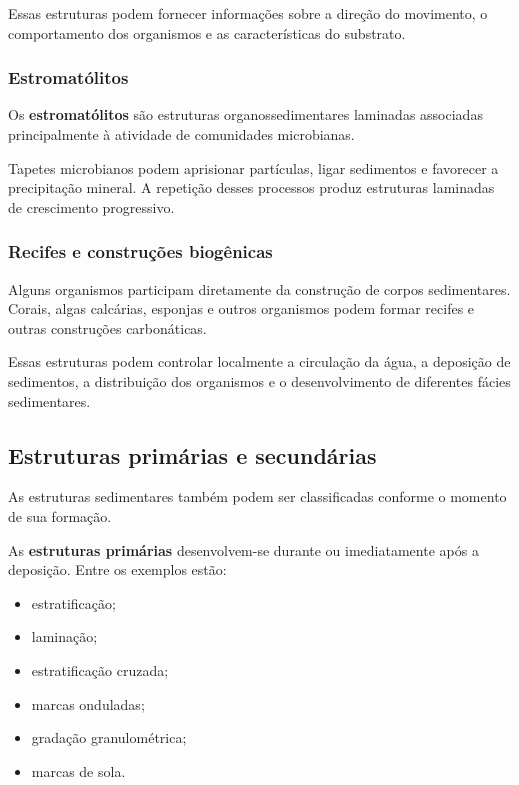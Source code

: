 Essas estruturas podem fornecer informações sobre a direção do movimento, o
comportamento dos organismos e as características do substrato.

\subsubsection{Estromatólitos}

Os \textbf{estromatólitos} são estruturas organossedimentares laminadas
associadas principalmente à atividade de comunidades microbianas.

Tapetes microbianos podem aprisionar partículas, ligar sedimentos e favorecer a
precipitação mineral. A repetição desses processos produz estruturas laminadas
de crescimento progressivo.

\subsubsection{Recifes e construções biogênicas}

Alguns organismos participam diretamente da construção de corpos sedimentares.
Corais, algas calcárias, esponjas e outros organismos podem formar recifes e
outras construções carbonáticas.

Essas estruturas podem controlar localmente a circulação da água, a deposição de
sedimentos, a distribuição dos organismos e o desenvolvimento de diferentes
fácies sedimentares.

\subsection{Estruturas primárias e secundárias}

As estruturas sedimentares também podem ser classificadas conforme o momento de
sua formação.

As \textbf{estruturas primárias} desenvolvem-se durante ou imediatamente após a
deposição. Entre os exemplos estão:

\begin{itemize}
    \item estratificação;
    \item laminação;
    \item estratificação cruzada;
    \item marcas onduladas;
    \item gradação granulométrica;
    \item marcas de sola.
\end{itemize}

